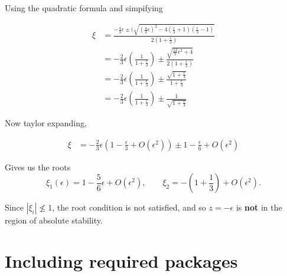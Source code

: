 \documentclass[12pt,a4paper]{article}
\begin{document}
 Using the quadratic formula and simpifying

 \begin{align*}
   \xi &= \frac{ - \frac{4}{3} \epsilon \pm ( \sqrt{(\frac{4}{3}\epsilon)^{2}
   - 4  (\frac{\epsilon}{3} + 1)( \frac{\epsilon}{3} -1)}}{2 (1
 + \frac{\epsilon}{3})} \\
       &= -\frac{2}{3} \epsilon \left( \frac{1}{1+ \frac{\epsilon}{3}}\right)
       \pm \frac{ \sqrt{ \frac{12}{9}\epsilon^{2}+4} }{2 (1+
       \frac{\epsilon}{3})} \\
       &= -\frac{2}{3} \epsilon \left( \frac{1}{1+ \frac{\epsilon}{3}}\right)
       \pm \frac{ \sqrt{1 + \frac{\epsilon}{3}} }{1 + \frac{\epsilon}{3}} \\
       &= -\frac{2}{3} \epsilon \left( \frac{1}{1+ \frac{\epsilon}{3}}\right)
       \pm \frac{1}{\sqrt{1 + \frac{\epsilon}{3}}}
 \end{align*}

 Now taylor expanding,

 \begin{align*}
   \xi &= - \frac{2}{3}\epsilon \left( 1- \frac{\epsilon}{3} + O(
   \epsilon^{2})\right) \pm 1 - \frac{\epsilon}{6} + O(\epsilon^{2})
 \end{align*}

 Gives us the roots
  \[
    \xi_1 (\epsilon) = 1 - \frac{5}{6}\epsilon + O(\epsilon^{2}), \qquad \xi_2
    = - \left(1 + \frac{1}{3}\right) + O(\epsilon^{2})
  .\] 

  Since $|\xi_i|\nleq 1$, the root condition is not satisfied, and so
  $z=-\epsilon$ is \textbf{not} in the region of absolute stability.

\section{Including required packages}
\end{document}
